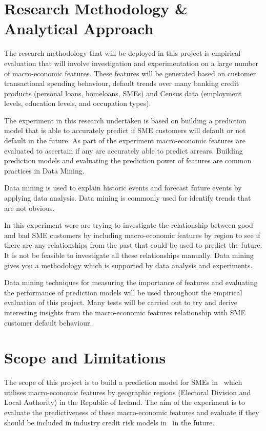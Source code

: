\section{Research Methodology \& Analytical Approach}

The research methodology that will be deployed in this project is empirical evaluation that will involve investigation and experimentation on a large number of macro-economic features. These features will be generated based on customer transactional spending behaviour, default trends over many banking credit products (personal loans, homeloans, SMEs) and Census data (employment levels, education levels, and occupation types).   

The experiment in this research undertaken is based on building a prediction model that is able to accurately predict if SME customers will default or not default in the future. As part of the experiment macro-economic features are evaluated to ascertain if any are accurately able to predict arrears. Building prediction models and evaluating the prediction power of features are common practices in Data Mining.

Data mining is used to explain historic events and forecast future events by applying data analysis. Data mining is commonly used for identify trends that are not obvious. 

In this experiment were are trying to investigate the relationship between good and bad SME customers by including macro-economic features by region to see if there are any relationships from the past that could be used to predict the future. It is not be feasible to investigate all these relationships manually. Data mining gives you a methodology which is supported by data analysis and experiments. 

Data mining techniques for measuring the importance of features and evaluating the performance of prediction models will be used throughout the empirical evaluation of this project. Many tests will be carried out to try and derive interesting insights from the macro-economic features relationship with SME customer default behaviour.

\section{Scope and Limitations}
The scope of this project is to build a prediction model for SMEs in \subjectname\  which utilises macro-economic features by geographic regions (Electoral Division and Local Authority) in the Republic of Ireland. The aim of the experiment is to evaluate the predictiveness of these macro-economic features and evaluate if they should be included in industry credit risk models in \subjectname\ in the future.

